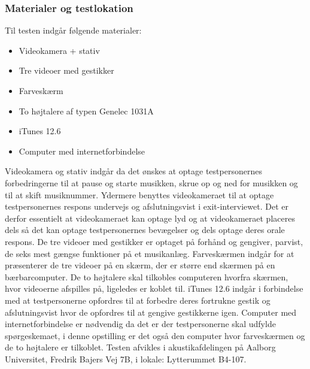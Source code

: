 \subsubsection{Materialer og testlokation}
\label{MaterialeOgTestlokationValgAfGestikker}
%
Til testen indgår følgende materialer:
%
\begin{itemize}
  \item Videokamera + stativ
  \item Tre videoer med gestikker
  \item Farveskærm 
  \item To højtalere af typen Genelec 1031A
  \item iTunes 12.6  
  \item Computer med internetforbindelse\blankline
\end{itemize}
% 
Videokamera og stativ indgår da det ønskes at optage testpersonernes forbedringerne til at pause og starte musikken, skrue op og ned for musikken og til at skift musiknummer. Ydermere benyttes videokameraet til at optage testpersonernes respons undervejs og afslutningsvist i exit-interviewet. Det er derfor essentielt at videokameraet kan optage lyd og at videokameraet placeres dels så det kan optage testpersonernes bevægelser og dels optage deres orale respons. De tre videoer med gestikker er optaget på forhånd og gengiver, parvist, de seks mest gængse funktioner på et musikanlæg. Farveskærmen indgår for at præsenterer de tre videoer på en skærm, der er større end skærmen på en bærbarcomputer. De to højtalere skal tilkobles computeren hvorfra skærmen, hvor videoerne afspilles på, ligeledes er koblet til. iTunes 12.6 indgår i forbindelse med at testpersonerne opfordres til at forbedre deres fortrukne gestik og afslutningsvist hvor de opfordres til at gengive gestikkerne igen. Computer med internetforbindelse er nødvendig da det er der testpersonerne skal udfylde spørgeskemaet, i denne opstilling er det også den computer hvor farveskærmen og de to højtalere er tilkoblet.\blankline
% 
Testen afvikles i akustikafdelingen på Aalborg Universitet, Fredrik Bajers Vej 7B, i lokale: Lytterummet B4-107. 



